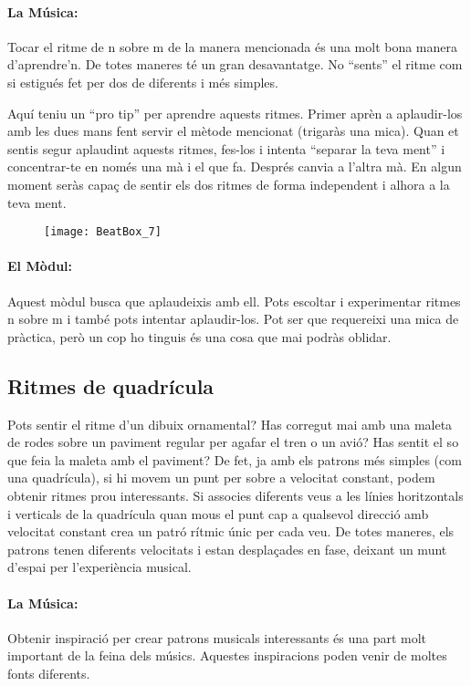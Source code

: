 \paragraph{La Música:}Tocar el ritme de n sobre m de la manera mencionada és una molt bona manera d'aprendre'n. De totes maneres té un gran desavantatge. No ``sents'' el ritme com si estigués fet per dos de diferents i més simples.

Aquí teniu un ``pro tip'' per aprendre aquests ritmes. Primer aprèn a aplaudir-los amb les dues mans fent servir el mètode mencionat (trigaràs una mica). Quan et sentis segur aplaudint aquests ritmes, fes-los i intenta ``separar la teva ment'' i concentrar-te en només una mà i el que fa. Després canvia a l'altra mà. En algun moment seràs capaç de sentir els dos ritmes de forma independent i alhora a la teva ment.

\begin{figure}[h]
\centering
\texttt{[image: BeatBox\_7]}
\end{figure}

\paragraph{El Mòdul:} Aquest mòdul busca que aplaudeixis amb ell. Pots escoltar i experimentar ritmes n sobre m i també pots intentar aplaudir-los. Pot ser que requereixi una mica de pràctica, però un cop ho tinguis és una cosa que mai podràs oblidar.

\subsection{Ritmes de quadrícula}
Pots sentir el ritme d'un dibuix ornamental? Has corregut mai amb una maleta de rodes sobre un paviment regular per agafar el tren o un avió? Has sentit el so que feia la maleta amb el paviment? De fet, ja amb els patrons més simples (com una quadrícula), si hi movem un punt per sobre a velocitat constant, podem obtenir ritmes prou interessants. Si associes diferents veus a les línies horitzontals i verticals de la quadrícula quan mous el punt cap a qualsevol direcció amb velocitat constant crea un patró rítmic únic per cada veu. De totes maneres, els patrons tenen diferents velocitats i estan desplaçades en fase, deixant un munt d'espai per l'experiència musical.

\paragraph{La Música:}
Obtenir inspiració per crear patrons musicals interessants és una part molt important de la feina dels músics. Aquestes inspiracions poden venir de moltes fonts diferents.


